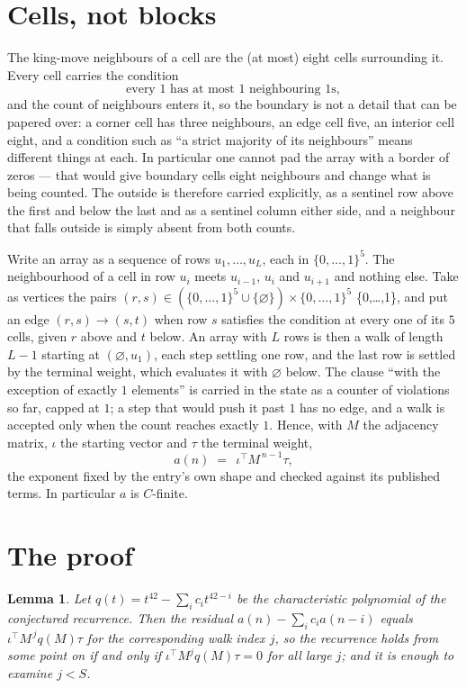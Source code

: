 \documentclass[11pt,a4paper]{article}
\theoremstyle{plain}
\newtheorem{lemma}[theorem]{Lemma}
\theoremstyle{definition}
\begin{document}
\section{Cells, not blocks}

The king-move neighbours of a cell are the (at most) eight cells surrounding it. Every cell
carries the condition
\[
\text{every }1\text{ has at most }1\text{ neighbouring }1\text{s},
\]
and the count of neighbours enters it, so the boundary is not a detail that can be papered
over: a corner cell has three neighbours, an edge cell five, an interior cell eight, and a
condition such as ``a strict majority of its neighbours'' means different things at each. In
particular one cannot pad the array with a border of zeros --- that would give boundary cells
eight neighbours and change what is being counted. The outside is therefore carried
explicitly, as a sentinel row above the first and below the last and as a sentinel column
either side, and a neighbour that falls outside is simply absent from both counts.

Write an array as a sequence of rows $u_1,\dots,u_L$, each in
$\{0,\dots,1\}^{5}$. The neighbourhood of a cell in row $u_i$ meets $u_{i-1}$,
$u_i$ and $u_{i+1}$ and nothing else. Take as vertices the pairs
$(r,s)\in(\{0,\dots,1\}^{5}\cup\{\varnothing\})\times\{0,\dots,1\}^{5}$ \times \{0,\dots,1\},
and put an edge $(r,s)\to(s,t)$ when row $s$ satisfies the condition at every one of its
$5$ cells, given $r$ above and $t$ below. An array with $L$ rows is then a walk of length
$L-1$ starting at $(\varnothing,u_1)$, each step settling one row, and the last row is
settled by the terminal weight, which evaluates it with $\varnothing$ below. The clause ``with the exception of exactly $1$ elements'' is carried in
the state as a counter of violations so far, capped at $1$; a step that would push it past
$1$ has no edge, and a walk is accepted only when the count reaches exactly $1$. Hence,
with $M$ the adjacency matrix, $\iota$ the starting vector and $\tau$ the terminal weight,
\[
a(n)\;=\;\,\iota^{\!\top}M^{\,n-1}\tau ,
\]
the exponent fixed by the entry's own shape and checked against its published terms. In
particular $a$ is $C$-finite.

\section{The proof}

\begin{lemma}\label{lem:crit}
Let $q(t)=t^{42}-\sum_i c_it^{42-i}$ be the characteristic polynomial of the
conjectured recurrence. Then the residual $a(n)-\sum_ic_ia(n-i)$ equals
$\iota^{\!\top}M^{\,j}q(M)\tau$ for the corresponding walk index $j$, so the
recurrence holds from some point on if and only if $\iota^{\!\top}M^{j}q(M)\tau=0$ for all
large $j$; and it is enough to examine $j<S$.
\end{lemma}
\end{document}
